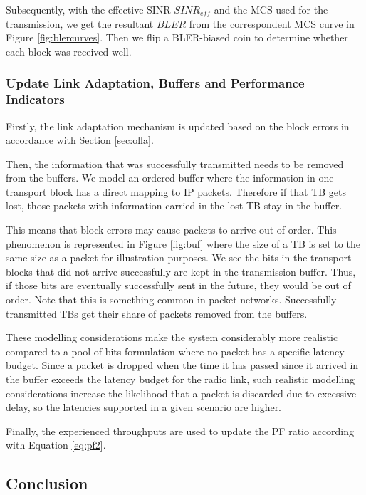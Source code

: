 Subsequently, with the effective SINR $SINR_{eff}$ and the MCS used for the transmission, we get the resultant $BLER$ from the correspondent MCS curve in Figure \ref{fig:blercurves}. Then we flip a \acs{BLER}-biased coin to determine whether each block was received well.


\subsubsection*{Update Link Adaptation, Buffers and Performance Indicators}

Firstly, the link adaptation mechanism is updated based on the block errors in accordance with Section \ref{sec:olla}. 

Then, the information that was successfully transmitted needs to be removed from the buffers. We model an ordered buffer where the information in one transport block has a direct mapping to IP packets. Therefore if that TB gets lost, those packets with information carried in the lost TB stay in the buffer.

This means that block errors may cause packets to arrive out of order. This phenomenon is represented in Figure \ref{fig:buf} where the size of a TB is set to the same size as a packet for illustration purposes. We see the bits in the transport blocks that did not arrive successfully are kept in the transmission buffer. Thus, if those bits are eventually successfully sent in the future, they would be out of order. Note that this is something common in packet networks. Successfully transmitted TBs get their share of packets removed from the buffers.



These modelling considerations make the system considerably more realistic compared to a pool-of-bits formulation where no packet has a specific latency budget. Since a packet is dropped when the time it has passed since it arrived in the buffer exceeds the latency budget for the radio link, such realistic modelling considerations increase the likelihood that a packet is discarded due to excessive delay, so the latencies supported in a given scenario are higher.

Finally, the experienced throughputs are used to update the PF ratio according with Equation \eqref{eq:pf2}.

\subsection*{Conclusion}

